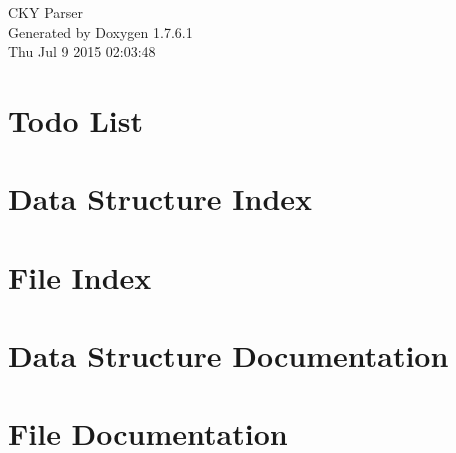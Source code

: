 \documentclass[a4paper]{book}
\begin{document}
\hypersetup{pageanchor=false,citecolor=blue}
\begin{titlepage}
\vspace*{7cm}
\begin{center}
{\Large \-C\-K\-Y \-Parser }\\
\vspace*{1cm}
{\large \-Generated by Doxygen 1.7.6.1}\\
\vspace*{0.5cm}
{\small Thu Jul 9 2015 02:03:48}\\
\end{center}
\end{titlepage}
\clearemptydoublepage
{}
\tableofcontents
\clearemptydoublepage
{}
\hypersetup{pageanchor=true,citecolor=blue}
\chapter{\-Todo \-List}
\label{todo}
\hypertarget{todo}{}

\chapter{\-Data \-Structure \-Index}

\chapter{\-File \-Index}

\chapter{\-Data \-Structure \-Documentation}









\chapter{\-File \-Documentation}






















\printindex
\end{document}
